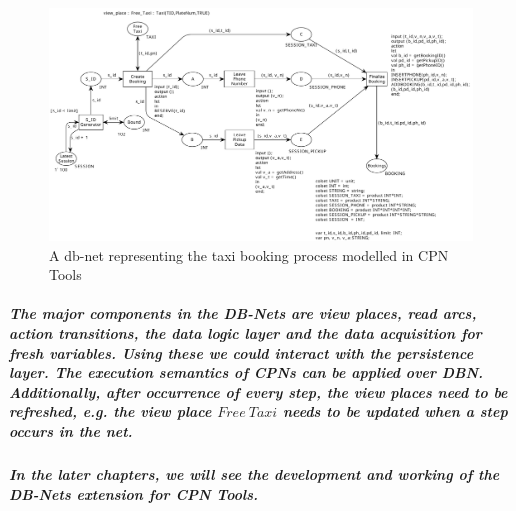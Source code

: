 \begin{figure}[!htbp]
	\centering
	\includegraphics[scale = 0.33]{DBN_CPNTools_Taxi_Example.pdf}
	\caption{A db-net representing the taxi booking process modelled in CPN Tools}
	\label{fig:DBN_CPNTools_Taxi_Example}
\end{figure}

\subparagraph*{\textnormal{The major components in the DB-Nets are view places, read arcs, action transitions, the data logic layer and the data acquisition for fresh variables. Using these we could interact with the persistence layer. The execution semantics of CPNs can be applied over DBN. Additionally, after occurrence of every step, the view places need to be refreshed, e.g. the view place $\mathit{Free\ Taxi}$ needs to be updated when a step occurs in the net.}}

\subparagraph*{\textnormal{In the later chapters, we will see the development and working of the DB-Nets extension for CPN Tools.}}



